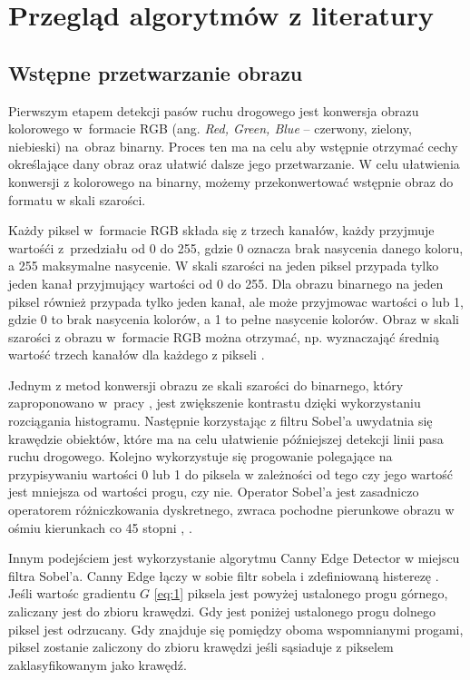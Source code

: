\chapter{Przegląd algorytmów z literatury}

\section{Wstępne przetwarzanie obrazu}
Pierwszym etapem detekcji pasów ruchu drogowego jest konwersja obrazu kolorowego w~formacie RGB (ang. \textit{Red, Green, Blue} -- czerwony, zielony, niebieski) na~obraz binarny.
Proces ten ma na celu aby wstępnie otrzymać cechy określające dany obraz oraz ułatwić dalsze jego przetwarzanie. W celu ułatwienia konwersji z kolorowego na binarny, możemy przekonwertować wstępnie obraz do formatu w skali szarości. 

Każdy piksel w~formacie RGB składa się z trzech kanałów, każdy przyjmuje wartośći z~przedziału od 0 do 255, gdzie 0 oznacza brak nasycenia danego koloru, a 255 maksymalne nasycenie.
W skali szarości na jeden piksel przypada tylko jeden kanał przyjmujący wartości od 0 do 255.
Dla obrazu binarnego na jeden piksel również przypada tylko jeden kanał, ale może przyjmowac wartości o lub 1, gdzie 0 to brak nasycenia kolorów, a 1 to pełne nasycenie kolorów.
Obraz w skali szarości z obrazu w~formacie RGB można otrzymać, np. wyznaczająć średnią wartość trzech kanałów dla każdego z pikseli \cite{4}.


Jednym z metod konwersji obrazu ze skali szarości do binarnego, który zaproponowano w~pracy \cite{4}, jest zwiększenie kontrastu dzięki wykorzystaniu rozciągania histogramu. Następnie korzystając z filtru Sobel'a uwydatnia się krawędzie obiektów, które ma na celu ułatwienie późniejszej detekcji linii pasa ruchu drogowego. Kolejno wykorzystuje się progowanie polegające na przypisywaniu wartości 0 lub 1 do piksela w zależności od tego czy jego wartość jest mniejsza od wartości progu, czy nie. Operator Sobel'a jest zasadniczo operatorem różniczkowania dyskretnego, zwraca pochodne pierunkowe obrazu w ośmiu kierunkach co 45 stopni \cite{3}, \cite{sobel}.

Innym podejściem \cite{reichenbach2018comparison} jest wykorzystanie algorytmu Canny Edge Detector w miejscu filtra Sobel'a. Canny Edge łączy w sobie filtr sobela i zdefiniowaną histerezę \cite{cany}. Jeśli wartośc gradientu $G$ \eqref{eq:1} piksela jest powyżej ustalonego progu górnego, zaliczany jest do zbioru krawędzi. Gdy jest poniżej ustalonego progu dolnego piksel jest odrzucany. Gdy znajduje się pomiędzy oboma wspomnianymi progami, piksel zostanie zaliczony do zbioru krawędzi jeśli sąsiaduje z pikselem zaklasyfikowanym jako krawędź.

